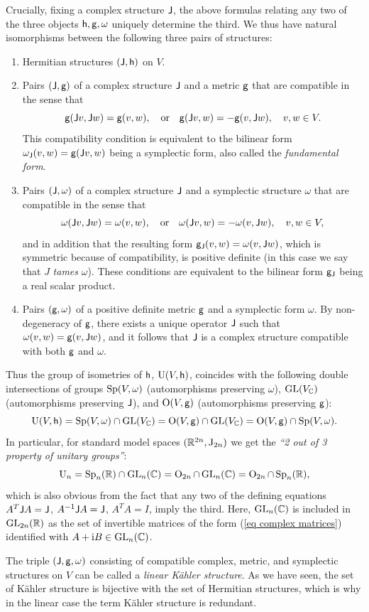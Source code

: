 \begin{example}
    Crucially, fixing a complex structure $\mathsf{J}$, the above formulas relating any two of the three objects $\mathsf{h},\mathsf{g},\omega$ uniquely determine the third. We thus have natural isomorphisms between the following three pairs of structures:
    \begin{enumerate}
        \item Hermitian structures $(\mathsf{J},\mathsf{h})$ on $V$.
        \item Pairs $(\mathsf{J},\mathsf{g})$ of a complex structure $\mathsf{J}$ and a metric $\mathsf{g}$ that are compatible in the sense that
        \[\mathsf{g}(\mathsf{J} v,\mathsf{J} w)=\mathsf{g}(v,w),\quad \text{or}\quad \mathsf{g}(\mathsf{J} v,w)=-\mathsf{g}(v,\mathsf{J} w),\quad v,w\in V.\]
        This compatibility condition is equivalent to the bilinear form $\omega_{\mathsf{J}}(v,w)=\mathsf{g}(\mathsf{J} v,w)$ being a symplectic form, also called the \emph{fundamental form}.
        \item Pairs $(\mathsf{J},\omega)$ of a complex structure $\mathsf{J}$ and a symplectic structure $\omega$ that are compatible in the sense that
        \[\omega(\mathsf{J} v,\mathsf{J} w)=\omega(v,w),\quad \text{or}\quad \omega(\mathsf{J} v,w)=-\omega(v,\mathsf{J} w),\quad v,w\in V,\]
        and in addition that the resulting form $\mathsf{g}_{\mathsf{J}}(v,w)=\omega(v,\mathsf{J} w)$, which is symmetric because of compatibility, is positive definite (in this case we say that $J$ \emph{tames} $\omega$). These conditions are equivalent to the bilinear form $\mathsf{g}_{\mathsf{J}}$ being a real scalar product.
        \item Pairs $(\mathsf{g},\omega)$ of a positive definite metric $\mathsf{g}$ and a symplectic form $\omega$. By non-degeneracy of $\mathsf{g}$, there exists a unique operator $\mathsf{J}$ such that $\omega(v,w)=\mathsf{g}(v,\mathsf{J} w)$, and it follows that $\mathsf{J}$ is a complex structure compatible with both $\mathsf{g}$ and $\omega$.
    \end{enumerate}
    Thus the group of isometries of $\mathsf{h}$, $\operatorname{U}(V,\mathsf{h})$, coincides with the following double intersections of groups $\operatorname{Sp}(V,\omega)$ (automorphisms preserving $\omega$), $\operatorname{GL}(V_{\mathbb{C}})$ (automorphisms preserving $\mathsf{J}$), and $\operatorname{O}(V,\mathsf{g})$ (automorphisms preserving $\mathsf{g}$):
    \[\operatorname{U}(V,\mathsf{h})=\operatorname{Sp}(V,\omega)\cap \operatorname{GL}(V_{\mathbb{C}})=\operatorname{O}(V,\mathsf{g})\cap \operatorname{GL}(V_{\mathbb{C}})=\operatorname{O}(V,\mathsf{g})\cap \operatorname{Sp}(V,\omega).\]
    In particular, for standard model spaces $(\mathbb{R}^{2n},\mathrm{J}_{2n})$ we get the \emph{``2 out of 3 property of unitary groups''}:
    \[\operatorname{U}_n=\operatorname{Sp}_n(\mathbb{R})\cap \operatorname{GL}_n(\mathbb{C})=\operatorname{O}_{2n}\cap \operatorname{GL}_n(\mathbb{C})=\operatorname{O}_{2n}\cap \operatorname{Sp}_n(\mathbb{R}),\]
    which is also obvious from the fact that any two of the defining equations $A^T\mathsf{J} A=\mathsf{J}$, $A^{-1}\mathsf{J} A= \mathsf{J}$, $A^TA=I$, imply the third.
    Here, $\operatorname{GL}_n(\mathbb{C})$ is included in $\operatorname{GL}_{2n}(\mathbb{R})$ as the set of invertible matrices of the form (\ref{eq complex matrices}) identified with $A+\mathrm{i} B\in \operatorname{GL}_n(\mathbb{C})$.
    
    The triple $(\mathsf{J},\mathsf{g},\omega)$ consisting of compatible complex, metric, and symplectic structures on $V$ can be called a \emph{linear K\"ahler structure}. As we have seen, the set of K\"ahler structure is bijective with the set of Hermitian structures, which is why in the linear case the term K\"ahler structure is redundant.
\end{example}

